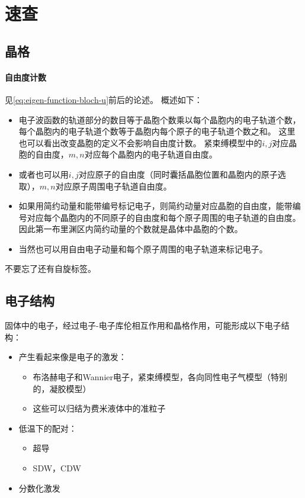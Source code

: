 \documentclass[hyperref, UTF8, a4paper]{ctexart}
\numberwithin{equation}{section}
\begin{document}








\section{速查}

\subsection{晶格}

\paragraph{自由度计数} 见\eqref{eq:eigen-function-bloch-u}前后的论述。
概述如下：
\begin{itemize}
    \item 电子波函数的轨道部分的数目等于晶胞个数乘以每个晶胞内的电子轨道个数，每个晶胞内的电子轨道个数等于晶胞内每个原子的电子轨道个数之和。
    这里也可以看出改变晶胞的定义不会影响自由度计数。
    紧束缚模型中的$i, j$对应晶胞的自由度，$m, n$对应每个晶胞内的电子轨道自由度。
    \item 或者也可以用$i, j$对应原子的自由度（同时囊括晶胞位置和晶胞内的原子选取），$m, n$对应原子周围电子轨道自由度。
    \item 如果用简约动量和能带编号标记电子，则简约动量对应晶胞的自由度，能带编号对应每个晶胞内的不同原子的自由度和每个原子周围的电子轨道的自由度。
    因此第一布里渊区内简约动量的个数就是晶体中晶胞的个数。
    \item 当然也可以用自由电子动量和每个原子周围的电子轨道来标记电子。
\end{itemize}
不要忘了还有自旋标签。

\subsection{电子结构}

固体中的电子，经过电子-电子库伦相互作用和晶格作用，可能形成以下电子结构：
\begin{itemize}
    \item 产生看起来像是电子的激发：
    \begin{itemize}
        \item 布洛赫电子和Wannier电子，紧束缚模型，各向同性电子气模型（特别的，凝胶模型）
        \item 这些可以归结为费米液体中的准粒子
    \end{itemize}
    \item 低温下的配对：
    \begin{itemize}
        \item 超导
        \item SDW，CDW
    \end{itemize}
    \item 分数化激发
\end{itemize}
\end{document}
